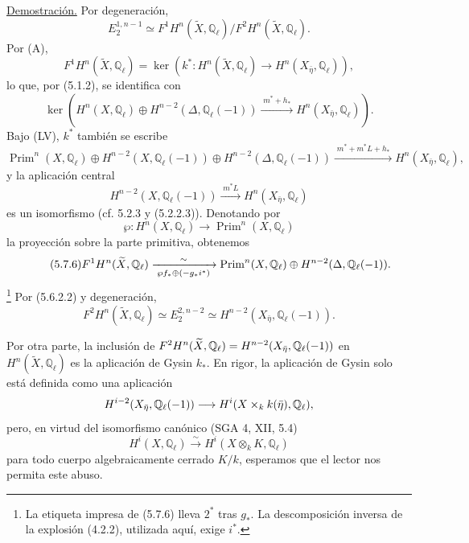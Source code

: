 \pageoriginale

\noindent\underline{Demostración.}
Por degeneración,
\[
E_2^{1,n-1}\simeq
F^1H^n(\widetilde X,\mathbb Q_\ell)
\big/F^2H^n(\widetilde X,\mathbb Q_\ell).
\]
Por (A),
\begin{equation}\tag{5.7.2}
F^1H^n(\widetilde X,\mathbb Q_\ell)
=\ker\!\left(
k^*:H^n(\widetilde X,\mathbb Q_\ell)\longrightarrow
H^n(X_{\bar\eta},\mathbb Q_\ell)
\right),
\end{equation}
lo que, por (5.1.2), se identifica con
\[
\ker\!\left(
H^n(X,\mathbb Q_\ell)
\oplus H^{n-2}(\Delta,\mathbb Q_\ell(-1))
\xrightarrow{\;m^*+h_*\;}
H^n(X_{\bar\eta},\mathbb Q_\ell)
\right).
\]
Bajo (LV), $k^*$ también se escribe
{\small\begin{equation}\tag{5.7.3}
\operatorname{Prim}^n(X,\mathbb Q_\ell)
\oplus H^{n-2}(X,\mathbb Q_\ell(-1))
\oplus H^{n-2}(\Delta,\mathbb Q_\ell(-1))
\xrightarrow{\;m^*+m^*L+h_*\;}
H^n(X_{\bar\eta},\mathbb Q_\ell),
\end{equation}}
y la aplicación central
\begin{equation}\tag{5.7.4}
H^{n-2}(X,\mathbb Q_\ell(-1))
\xrightarrow{\;m^*L\;}
H^n(X_{\bar\eta},\mathbb Q_\ell)
\end{equation}
es un isomorfismo (cf. 5.2.3 y (5.2.2.3)). Denotando por
\begin{equation}\tag{5.7.5}
\wp:H^n(X,\mathbb Q_\ell)\longrightarrow
\operatorname{Prim}^n(X,\mathbb Q_\ell)
\end{equation}
la proyección sobre la parte primitiva, obtenemos
\begin{equation}\tag{5.7.6}
F^1H^n(\widetilde X,\mathbb Q_\ell)
\xrightarrow[\;\wp f_*\oplus(-g_*\sisi{2^*}{i^*})\;]{\sim}
\operatorname{Prim}^n(X,\mathbb Q_\ell)
\oplus H^{n-2}(\Delta,\mathbb Q_\ell(-1)).
\end{equation}
\footnote{La etiqueta impresa de (5.7.6) lleva $2^*$ tras $g_*$.
La descomposición inversa de la explosión (4.2.2), utilizada aquí,
exige $i^*$.}
Por (5.6.2.2) y degeneración,
\begin{equation}\tag{5.7.7}
F^2H^n(\widetilde X,\mathbb Q_\ell)
\simeq E_2^{2,n-2}
\simeq H^{n-2}(X_{\bar\eta},\mathbb Q_\ell(-1)).
\end{equation}

\pageoriginale

Por otra parte, la inclusión de
$F^2H^{\sisi{N}{n}}(\widetilde X,\mathbb Q_\ell)
=H^{n-2}(X_{\bar\eta},\mathbb Q_\ell(-1))$
en $H^n(\widetilde X,\mathbb Q_\ell)$ es la aplicación de Gysin $k_*$.
En rigor, la aplicación de Gysin solo está definida como una aplicación
\[
\sisi{H^{i-2}(X_{\bar\eta},\mathbb Q_\ell)}
      {H^{i-2}(X_{\bar\eta},\mathbb Q_\ell(-1))}
\longrightarrow
H^i(X\times_k k(\bar\eta),\mathbb Q_\ell),
\]
pero, en virtud del isomorfismo canónico (SGA 4, XII, 5.4)
\[
H^i(X,\mathbb Q_\ell)\xrightarrow{\sim}
H^i(X\otimes_kK,\mathbb Q_\ell)
\]
para todo cuerpo algebraicamente cerrado $K/k$, esperamos que el lector
nos permita este abuso.

